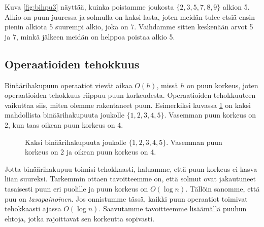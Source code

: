 Kuva \ref{fig:bihpu3} näyttää, kuinka poistamme joukosta $\{2,3,5,7,8,9\}$ alkion 5.
Alkio on puun juuressa ja solmulla on kaksi lasta,
joten meidän tulee etsiä ensin pienin alkiota 5 suurempi alkio,
joka on 7.
Vaihdamme sitten keskenään arvot 5 ja 7,
minkä jälkeen meidän on helppoa poistaa alkio 5.

\subsection{Operaatioiden tehokkuus}

Binäärihakupuun operaatiot vievät aikaa $O(h)$,
missä $h$ on puun korkeus, joten operaatioiden tehokkuus
riippuu puun korkeudesta.
Operaatioiden tehokkuuteen vaikuttaa siis,
miten olemme rakentaneet puun.
Esimerkiksi kuvassa \ref{fig:bihkor} on kaksi mahdollista
binäärihakupuuta joukolle $\{1,2,3,4,5\}$.
Vasemman puun korkeus on 2, kun taas oikean puun korkeus on 4.

\begin{figure}
\center
{}
\caption{Kaksi binäärihakupuuta joukolle $\{1,2,3,4,5\}$.
Vasemman puun korkeus on 2 ja oikean puun korkeus on 4.}
\label{fig:bihkor}
\end{figure}


Jotta binäärihakupuu toimisi tehokkaasti, haluamme,
että puun korkeus ei kasva liian suureksi.
Tarkemmin ottaen tavoitteemme on, että
solmut ovat jakautuneet tasaisesti puun eri puolille
ja puun korkeus on $O(\log n)$.
Tällöin sanomme, että puu on \emph{tasapainoinen}.
Jos onnistumme tässä, kaikki puun operaatiot toimivat
tehokkaasti ajassa $O(\log n)$.
Saavutamme tavoitteemme
lisäämällä puuhun ehtoja, jotka rajoittavat
sen korkeutta sopivasti.

